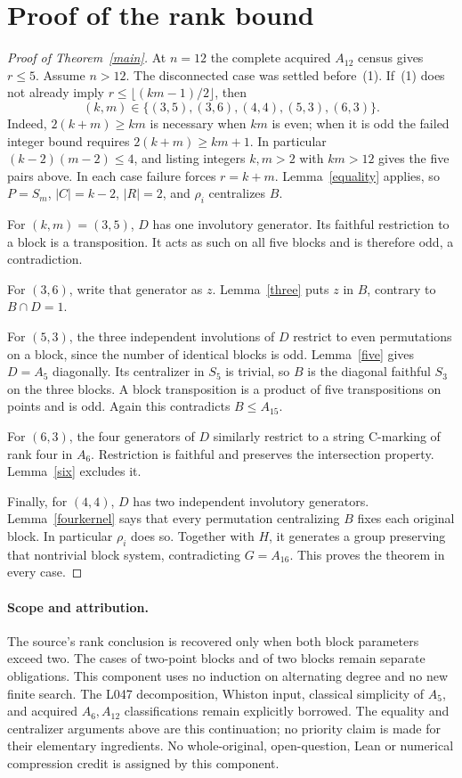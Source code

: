\documentclass[11pt,a4paper]{article}
\begin{document}
\section{Proof of the rank bound}
\begin{proof}[Proof of Theorem~\ref{main}]
At $n=12$ the complete acquired $A_{12}$ census gives $r\le5$.
Assume $n>12$. The disconnected case was settled before~(1).
If~(1) does not already imply $r\le\lfloor(km-1)/2\rfloor$, then
\[
        (k,m)\in\{(3,5),(3,6),(4,4),(5,3),(6,3)\}.
\]
Indeed, $2(k+m)\ge km$ is necessary when $km$ is even; when it is
odd the failed integer bound requires $2(k+m)\ge km+1$.
In particular $(k-2)(m-2)\le4$, and listing integers $k,m>2$ with
$km>12$ gives the five pairs above. In each case failure forces
$r=k+m$. Lemma~\ref{equality} applies, so $P=S_m$, $|C|=k-2$,
$|R|=2$, and $\rho_i$ centralizes $B$.

For $(k,m)=(3,5)$, $D$ has one involutory generator. Its faithful
restriction to a block is a transposition. It acts as such on all five
blocks and is therefore odd, a contradiction.

For $(3,6)$, write that generator as $z$. Lemma~\ref{three} puts
$z$ in $B$, contrary to $B\cap D=1$.

For $(5,3)$, the three independent involutions of $D$ restrict to
even permutations on a block, since the number of identical blocks is
odd. Lemma~\ref{five} gives $D=A_5$ diagonally. Its centralizer in
$S_5$ is trivial, so $B$ is the diagonal faithful $S_3$ on the three
blocks. A block transposition is a product of five transpositions on
points and is odd. Again this contradicts $B\le A_{15}$.

For $(6,3)$, the four generators of $D$ similarly restrict to a
string C-marking of rank four in $A_6$. Restriction is faithful and
preserves the intersection property. Lemma~\ref{six} excludes it.

Finally, for $(4,4)$, $D$ has two independent involutory generators.
Lemma~\ref{fourkernel} says that every permutation centralizing $B$
fixes each original block. In particular $\rho_i$ does so. Together
with $H$, it generates a group preserving that nontrivial block system,
contradicting $G=A_{16}$. This proves the theorem in every case.
\end{proof}

\paragraph{Scope and attribution.}
The source's rank conclusion is recovered only when both block parameters
exceed two. The cases of two-point blocks and of two blocks remain
separate obligations. This component uses no induction on alternating
degree and no new finite search. The L047 decomposition, Whiston input,
classical simplicity of $A_5$, and acquired $A_6,A_{12}$ classifications
remain explicitly borrowed. The equality and centralizer arguments above
are this continuation; no priority claim is made for their elementary
ingredients. No whole-original, open-question, Lean or numerical
compression credit is assigned by this component.
\end{document}
